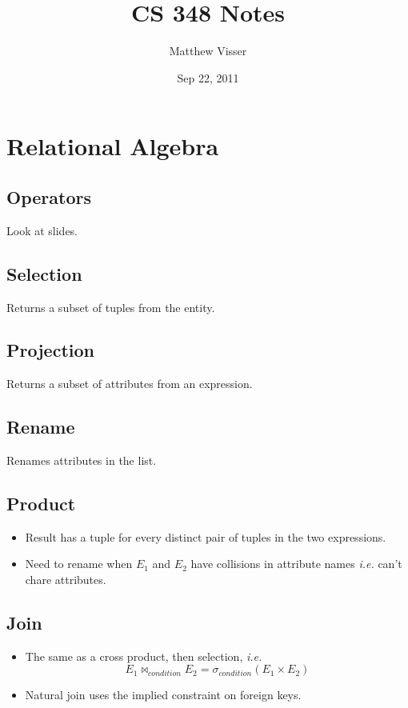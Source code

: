 \documentclass[12pt]{article}
\begin{document}
\title{CS 348 Notes}
\author{Matthew Visser}
\date{Sep 22, 2011}
\maketitle

\section{Relational Algebra}

\subsection{Operators}

Look at slides.

\subsection{Selection}

Returns a subset of tuples from the entity.

\subsection{Projection}

Returns a subset of attributes from an expression.

\subsection{Rename}

Renames attributes in the list.

\subsection{Product}

\begin{itemize}
    \item Result has a tuple for every distinct pair of tuples in the two
        expressions.
    \item Need to rename when $E_1$ and $E_2$ have collisions in attribute
        names \textit{i.e.} can't chare attributes.
\end{itemize}

\subsection{Join}

\begin{itemize}
    \item The same as a cross product, then selection, \textit{i.e.}
        \[
        E_1 \Join_{condition} E_2 = \sigma_{condition}(E_1 \times E_2)
        \]
    \item Natural join uses the implied constraint on foreign keys.
\end{itemize}
\end{document}
